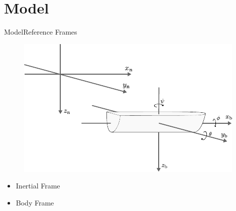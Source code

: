 \section{Model}

\begin{frame}{Model}{Reference Frames}
    \begin{figure}[H]
        \centering
        \includegraphics[width=0.7\linewidth]{figures/boat3D}
    \end{figure}
    \begin{itemize}
        \item Inertial Frame
        \item Body Frame
    \end{itemize}
\end{frame}


